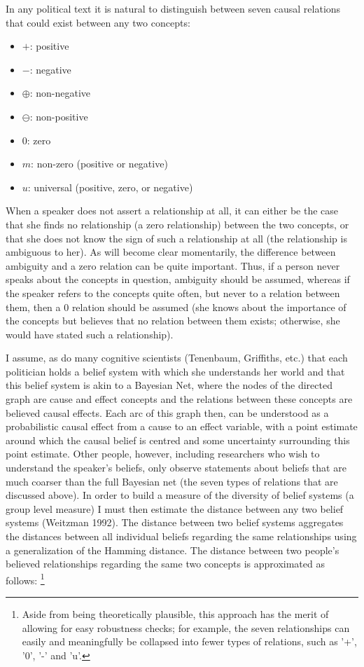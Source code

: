 \documentclass[12pt]{article}
\begin{document}
In any political text it is natural to distinguish between seven causal relations that could exist between any two concepts:

\begin{itemize}
\item $+$: positive
\item $-$: negative
\item $\oplus$: non-negative
\item $\ominus$: non-positive
\item $0$: zero
\item $m$: non-zero (positive or negative)
\item $u$: universal (positive, zero, or negative)
\end{itemize} 

When a speaker does not assert a relationship at all, it can either be the case that she finds no relationship (a zero relationship) between the two concepts, or that she does not know the sign of such a relationship at all (the relationship is ambiguous to her). As will become clear momentarily, the difference between ambiguity and a zero relation can be quite important. Thus, if a person never speaks about the concepts in question, ambiguity should be assumed, whereas if the speaker refers to the concepts quite often, but never to a relation between them, then a $0$ relation should be assumed (she knows about the importance of the concepts but believes that no relation between them exists; otherwise, she would have stated such a relationship).  

I assume, as do many cognitive scientists (Tenenbaum, Griffiths, etc.) that each politician holds a belief system with which she understands her world and that this belief system is akin to a Bayesian Net, where the nodes of the directed graph are cause and effect concepts and the relations between these concepts are believed causal effects.  Each arc of this graph then, can be understood as a probabilistic causal effect from a cause to an effect variable, with a point estimate around which the causal belief is centred and some uncertainty surrounding this point estimate.  Other people, however, including researchers who wish to understand the speaker's beliefs, only observe statements about beliefs that are much coarser than the full Bayesian net (the seven types of relations that are discussed above).  In order to build a measure of the diversity of belief systems (a group level measure) I must then estimate the distance between any two belief systems (Weitzman 1992). The distance between two belief systems aggregates the distances between all individual beliefs regarding the same relationships using a generalization of the Hamming distance.  The distance between two people's believed relationships regarding the same two concepts is approximated as follows: \footnote{Aside from being theoretically plausible, this approach has the merit of allowing for easy robustness checks; for example, the seven relationships can easily and meaningfully be collapsed into fewer types of relations, such as '+', '0', '-' and 'u'.} 
\end{document}
